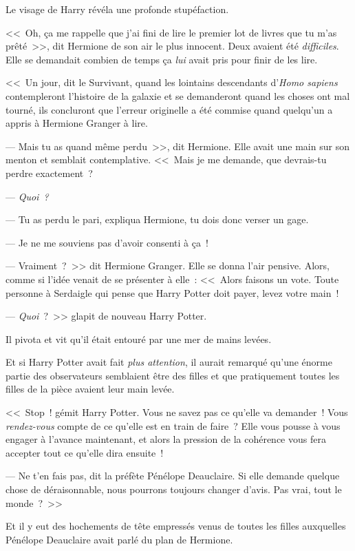 Le visage de Harry révéla une profonde stupéfaction.

<<~Oh, ça me rappelle que j'ai fini de lire le premier lot de livres que tu m'as prêté~>>, dit Hermione de son air le plus innocent. Deux avaient été \emph{difficiles}. Elle se demandait combien de temps ça \emph{lui} avait pris pour finir de les lire.

<<~Un jour, dit le Survivant, quand les lointains descendants d'\emph{Homo sapiens} contempleront l'histoire de la galaxie et se demanderont quand les choses ont mal tourné, ils concluront que l'erreur originelle a été commise quand quelqu'un a appris à Hermione Granger à lire.

--- Mais tu as quand même perdu~>>, dit Hermione. Elle avait une main sur son menton et semblait contemplative. <<~Mais je me demande, que devrais-tu perdre exactement~?

--- \emph{Quoi~?}

--- Tu as perdu le pari, expliqua Hermione, tu dois donc verser un gage.

--- Je ne me souviens pas d'avoir consenti à ça~!

--- Vraiment~?~>> dit Hermione Granger. Elle se donna l'air pensive. Alors, comme si l'idée venait de se présenter à elle~: <<~Alors faisons un vote. Toute personne à Serdaigle qui pense que Harry Potter doit payer, levez votre main~!

--- \emph{Quoi}~?~>> glapit de nouveau Harry Potter.

Il pivota et vit qu'il était entouré par une mer de mains levées.

Et si Harry Potter avait fait \emph{plus attention}, il aurait remarqué qu'une énorme partie des observateurs semblaient être des filles et que pratiquement toutes les filles de la pièce avaient leur main levée.

<<~Stop~! gémit Harry Potter. Vous ne savez pas ce qu'elle va demander~! Vous \emph{rendez-vous} compte de ce qu'elle est en train de faire~? Elle vous pousse à vous engager à l'avance maintenant, et alors la pression de la cohérence vous fera accepter tout ce qu'elle dira ensuite~!

--- Ne t'en fais pas, dit la préfète Pénélope Deauclaire. Si elle demande quelque chose de déraisonnable, nous pourrons toujours changer d'avis. Pas vrai, tout le monde~?~>>

Et il y eut des hochements de tête empressés venus de toutes les filles auxquelles Pénélope Deauclaire avait parlé du plan de Hermione.

